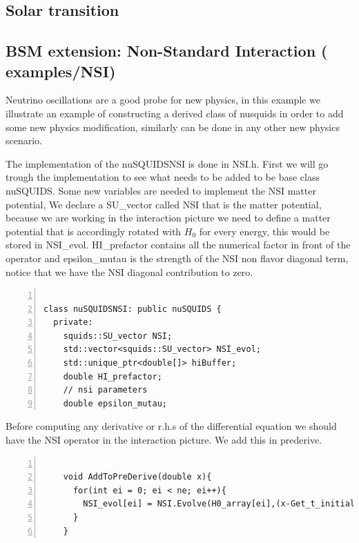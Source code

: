 \subsection{Solar transition}

\subsection{ BSM extension: Non-Standard  Interaction \textnormal{({\ttf
      examples/NSI})}}
Neutrino oscillations are a good probe for new physics, in this
example we illustrate an example of constructing a derived class of
nusquids in order to add some new physics modification, similarly can
be done in any other new physics scenario.

The implementation of the {\ttf nuSQUIDSNSI} is done in {\ttf NSI.h}.
First we will go trough the implementation to see what needs to be
added to be base class nuSQUIDS.
Some new variables are needed to implement the NSI matter potential,
We declare a {\ttf SU\_vector} called {\ttf NSI} that is the matter
potential, because we are working in the interaction picture we need
to define a matter potential that is accordingly rotated with $H_0$ for
every energy, this would be stored in {\ttf NSI\_evol}.
{\ttf HI\_prefactor} contains all the numerical factor in front of the
operator and {\ttf epsilon\_mutau} is the strength of the NSI non flavor
diagonal term, notice that we have the NSI diagonal contribution to
zero.

\begin{lstlisting}[frame=leftline, numbers =
  left,breaklines=true,label = ex:sin1]

class nuSQUIDSNSI: public nuSQUIDS {
  private:
    squids::SU_vector NSI;
    std::vector<squids::SU_vector> NSI_evol;
    std::unique_ptr<double[]> hiBuffer;
    double HI_prefactor;
    // nsi parameters
    double epsilon_mutau;

\end{lstlisting}

Before computing any derivative or r.h.s of the differential equation
we should have the NSI operator in the interaction picture. We add
this in prederive.
\begin{lstlisting}[frame=leftline, numbers =
  left,breaklines=true,label = ex:sin1,firstnumber=last]

    void AddToPreDerive(double x){
      for(int ei = 0; ei < ne; ei++){
        NSI_evol[ei] = NSI.Evolve(H0_array[ei],(x-Get_t_initial()));
      }
    }

\end{lstlisting}

